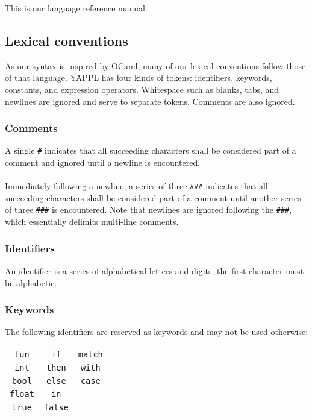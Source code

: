 This is our language reference manual. 

\subsection{Lexical conventions}

As our syntax is inspired by OCaml, many of our lexical conventions follow those of that language. YAPPL has four kinds of tokens: identifiers, keywords, constants, and expression operators. Whitespace such as blanks, tabs, and newlines are ignored and serve to separate tokens. Comments are also ignored.

\subsubsection{Comments}

A single \texttt{\#} indicates that all succeeding characters shall be considered part of a comment and ignored until a newline is encountered. \\
\\
Immediately following a newline, a series of three \texttt{\#\#\#} indicates that all succeeding characters shall be considered part of a comment until another series of three \texttt{\#\#\#} is encountered. Note that newlines are ignored following the \texttt{\#\#\#}, which essentially delimits multi-line comments.

\subsubsection{Identifiers}

An identifier is a series of alphabetical letters and digits; the first character must be alphabetic. 

\subsubsection{Keywords}

The following identifiers are reserved as keywords and may not be used otherwise:
\begin{table}[htdp]
\begin{tabular}{c c c}
\texttt{fun} & \texttt{if} &\texttt{match} \\
\texttt{int} & \texttt{then} & \texttt{with} \\
\texttt{bool} & \texttt{else} &\texttt{case} \\
\texttt{float} & \texttt{in} \\
\texttt{true} & \texttt{false} \\
\end{tabular}
\label{default}
\end{table}%




